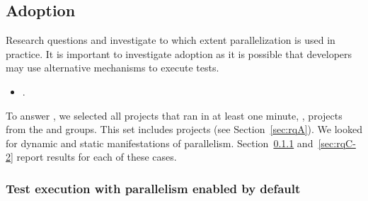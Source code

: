 \begin{center}
\end{center}

\subsection{Adoption}
\label{sec:rqC}
\label{sec:rqE}

Research questions \numRQC{} and \numRQE{} investigate to which extent
parallelization is used in practice.  It is important to investigate
adoption as it is possible that developers may use alternative
mechanisms to execute tests.

\begin{itemize}
    \item \numRQC. \emph{\RQC}
\end{itemize}

To answer \numRQC{}, we selected all projects that ran in at least one
minute, \ie, projects from the \medg{} and \longg{} groups.  This set
includes \numMedLong{} projects (see Section~\ref{sec:rqA}).  We
looked for dynamic and static manifestations of parallelism.
Section~\ref{sec:rqC-1} and~\ref{sec:rqC-2} report results for each of
these cases.

\vspace{1ex}
\subsubsection{Test execution with parallelism enabled by default}
\label{sec:rqC-1}


